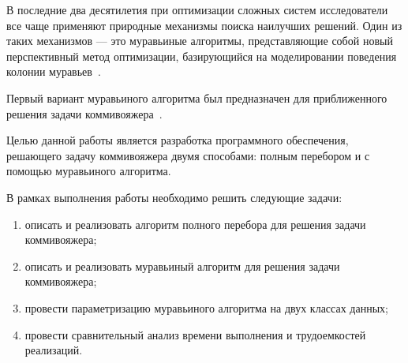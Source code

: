 \vspace{\baselineskip}

В последние два десятилетия при оптимизации сложных систем исследователи все чаще применяют природные механизмы поиска наилучших решений. 
Один из таких механизмов --- это муравьиные алгоритмы, представляющие собой новый перспективный метод оптимизации, базирующийся на моделировании поведения колонии муравьев~\cite{shtovba}. 

Первый вариант муравьиного алгоритма был предназначен для приближенного решения задачи коммивояжера~\cite{ershov}. 

Целью данной работы является разработка программного обеспечения, решающего задачу коммивояжера двумя способами: полным перебором и с помощью муравьиного алгоритма.

В рамках выполнения работы необходимо решить следующие задачи: 
\begin{enumerate}[label=---]
	\item описать и реализовать алгоритм полного перебора для решения задачи коммивояжера;
	\item описать и реализовать муравьиный алгоритм для решения задачи коммивояжера;
	\item провести параметризацию муравьиного алгоритма на двух классах данных;
	\item провести сравнительный анализ времени выполнения и трудоемкостей реализаций.
\end{enumerate}